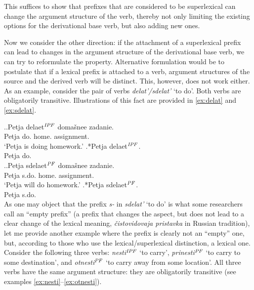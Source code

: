 This suffices to show that prefixes that are considered to be superlexical can change the argument structure of the verb, thereby not only limiting the existing options for the derivational base verb, but also adding new ones.

Now we consider the other direction: if the attachment of a superlexical prefix can lead to changes in the argument structure of the derivational base verb, we can try to reformulate the property. Alternative formulation would be to postulate that if a lexical prefix is attached to a verb, argument structures of the source and the derived verb will be distinct. This, however, does not work either. As an example, consider the pair of verbs \textit{delat'/sdelat'} `to do'. Both verbs are obligatorily transitive. Illustrations of this fact are provided in \ref{ex:delat} and \ref{ex:sdelat}.

\ex.\label{ex:delat}\ag.Petja delaet$^{\mathit{IPF}}$ doma\v{s}nee zadanie.\\
Petja do. home. assignment.\\
\vspace{0.5em}
`Petja is doing homework.'
\bg.*Petja delaet$^{\mathit{IPF}}$.\\
Petja do.\\

\ex.\label{ex:sdelat}\ag.Petja sdelaet$^{\mathit{PF}}$ doma\v{s}nee zadanie.\\
Petja s.do. home. assignment.\\
\vspace{0.5em}
`Petja will do homework.'
\bg.*Petja sdelaet$^{\mathit{PF}}$.\\
Petja s.do.\\


As one may object that the prefix \textit{s-} in \textit{sdelat'} `to do' is what some researchers call an ``empty prefix'' (a prefix that changes the aspect, but does not lead to a clear change of the lexical meaning, \textit{\v{c}istovidovaja pristavka} in Russian tradition), let me provide another example where the prefix is clearly not an ``empty'' one, but, according to those who use the lexical/superlexical distinction, a lexical one.  Consider the following three verbs: \textit{nesti$^{\mathit{IPF}}$} `to carry', \textit{prinesti$^{\mathit{PF}}$} `to carry to some destination',  and \textit{otnesti$^{\mathit{PF}}$} `to carry away from some location'. All three verbs have the same argument structure: they are obligatorily transitive (see examples \ref{ex:nesti}--\ref{ex:otnesti}).

